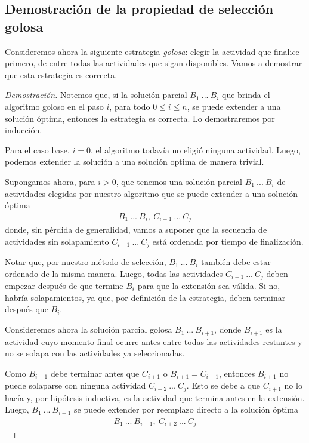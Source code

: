 
\vspace{0.5em}
\subsection{Demostración de la propiedad de selección golosa} Consideremos ahora la siguiente estrategia \textit{golosa}: elegir la actividad que finalice primero, de entre todas las actividades que sigan disponibles. Vamos a demostrar que esta estrategia es correcta.

\begin{proof}[Demostración]
    Notemos que, si la solución parcial $B_1\ ...\ B_i$ que brinda el algoritmo goloso en el paso $i$, para todo $0 \leq i \leq n$, se puede extender a una solución óptima, entonces la estrategia es correcta. Lo demostraremos por inducción.

    Para el caso base, $i = 0$, el algoritmo todavía no eligió ninguna actividad. Luego, podemos extender la solución a una solución optima de manera trivial.

    Supongamos ahora, para $i > 0$, que tenemos una solución parcial $B_1\ ...\ B_i$ de actividades elegidas por nuestro algoritmo que se puede extender a una solución óptima
    \begin{align}\nonumber
        B_1\ ...\ B_i,\ C_{i+1}\ ...\ C_j
    \end{align}
    donde, sin pérdida de generalidad, vamos a suponer que la secuencia de actividades sin solapamiento $C_{i+1}\ ...\ C_j$ está ordenada por tiempo de finalización. 

    Notar que, por nuestro método de selección, $B_1\ ...\ B_i$ también debe estar ordenado de la misma manera. Luego, todas las actividades $C_{i+1}\ ...\ C_j$ deben empezar después de que termine $B_i$ para que la extensión sea válida. Si no, habría solapamientos, ya que, por definición de la estrategia, deben terminar después que $B_i$.

    Consideremos ahora la solución parcial golosa $B_1\ ...\ B_{i+1}$, donde $B_{i+1}$ es la actividad cuyo momento final ocurre antes entre todas las actividades restantes y no se solapa con las actividades ya seleccionadas. 

    Como $B_{i+1}$ debe terminar antes que $C_{i+1}$ o $B_{i+1} = C_{i+1}$, entonces $B_{i+1}$ no puede solaparse con ninguna actividad $C_{i+2}\ ...\ C_j$. Esto se debe a que $C_{i+1}$ no lo hacía y, por hipótesis inductiva, es la actividad que termina antes en la extensión. Luego, $B_1\ ...\ B_{i+1}$ se puede extender por reemplazo directo a la solución óptima 
    \begin{align}\nonumber
        B_1\ ...\ B_{i+1},\ C_{i+2}\ ...\ C_j
    \end{align}
\end{proof}

